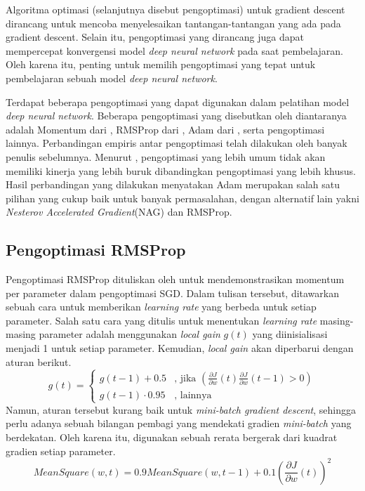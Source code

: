 Algoritma optimasi (selanjutnya disebut pengoptimasi) untuk gradient descent dirancang untuk mencoba menyelesaikan tantangan-tantangan yang ada pada gradient descent. Selain itu, pengoptimasi yang dirancang juga dapat mempercepat konvergensi model \emph{deep neural network} pada saat pembelajaran. Oleh karena itu, penting untuk memilih pengoptimasi yang tepat untuk pembelajaran sebuah model \emph{deep neural network}.

Terdapat beberapa pengoptimasi yang dapat digunakan dalam pelatihan model \emph{deep neural network}. Beberapa pengoptimasi yang disebutkan oleh \textcite{Ruder2016} diantaranya adalah Momentum dari \textcite{qian1999momentum}, RMSProp dari \textcite{hinton2012neural}, Adam dari \textcite{ADAMKingma}, serta pengoptimasi lainnya. Perbandingan empiris antar pengoptimasi telah dilakukan oleh banyak penulis sebelumnya. Menurut \textcite{Choi2019}, pengoptimasi yang lebih umum tidak akan memiliki kinerja yang lebih buruk dibandingkan pengoptimasi yang lebih khusus. Hasil perbandingan yang dilakukan \textcite{benchmark2021schmidt} menyatakan Adam merupakan salah satu pilihan yang cukup baik untuk banyak permasalahan, dengan alternatif lain yakni \emph{Nesterov Accelerated Gradient}(NAG) dan RMSProp.

\subsection{Pengoptimasi RMSProp}
Pengoptimasi RMSProp dituliskan oleh \textcite{hinton2012neural} untuk mendemonstrasikan momentum per parameter dalam pengoptimasi SGD. Dalam tulisan tersebut, ditawarkan sebuah cara untuk memberikan \emph{learning rate} yang berbeda untuk setiap parameter. Salah satu cara yang ditulis untuk menentukan \emph{learning rate} masing-masing parameter adalah menggunakan \emph{local gain} $g(t)$ yang diinisialisasi menjadi 1 untuk setiap parameter. Kemudian, \emph{local gain} akan diperbarui dengan aturan berikut.
\begin{equation*}
  g(t) =
  \begin{cases}
    g(t-1) + 0.5      & \text{, jika } \left(
    \frac{\partial J}{\partial w}(t) \frac{\partial J}{\partial w}(t-1) > 0
    \right)                                   \\
    g(t-1) \cdot 0.95 & \text{, lainnya}
  \end{cases}
\end{equation*}
Namun, aturan tersebut kurang baik untuk \emph{mini-batch gradient descent}, sehingga perlu adanya sebuah bilangan pembagi yang mendekati gradien \emph{mini-batch} yang berdekatan. Oleh karena itu, digunakan sebuah rerata bergerak dari kuadrat gradien setiap parameter.
$$
  MeanSquare(w, t) = 0.9 MeanSquare(w, t-1) + 0.1\left(\frac{\partial J}{\partial w}(t)\right)^2
$$

